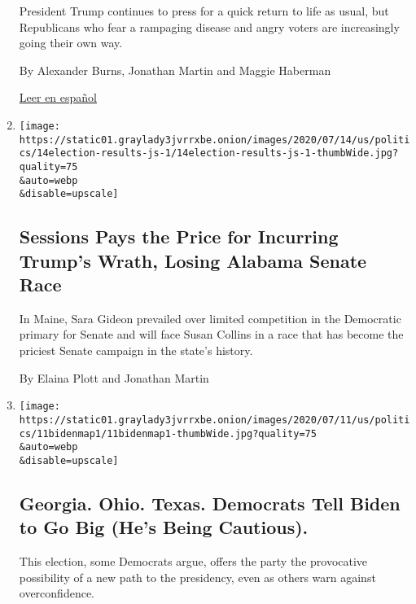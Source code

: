 \begin{enumerate}
  President Trump continues to press for a quick return to life as
  usual, but Republicans who fear a rampaging disease and angry voters
  are increasingly going their own way.

  By Alexander Burns, Jonathan Martin and Maggie Haberman

  \href{https://www.nytimes3xbfgragh.onion/es/2020/07/21/espanol/estados-unidos/donald-trump-coronavirus-republicanos.html}{Leer
  en español}
\item
  \href{/2020/07/14/us/politics/Election-primary-runoff-results.html}{}

  \texttt{[image: https://static01.graylady3jvrrxbe.onion/images/2020/07/14/us/politics/14election-results-js-1/14election-results-js-1-thumbWide.jpg?quality=75\\\&auto=webp\\\&disable=upscale]}

  \hypertarget{sessions-pays-the-price-for-incurring-trumps-wrath-losing-alabama-senate-race}{%
  \subsection{Sessions Pays the Price for Incurring Trump's Wrath,
  Losing Alabama Senate
  Race}\label{sessions-pays-the-price-for-incurring-trumps-wrath-losing-alabama-senate-race}}

  In Maine, Sara Gideon prevailed over limited competition in the
  Democratic primary for Senate and will face Susan Collins in a race
  that has become the priciest Senate campaign in the state's history.

  By Elaina Plott and Jonathan Martin
\item
  \href{/2020/07/11/us/politics/trump-biden-2020-election.html}{}

  \texttt{[image: https://static01.graylady3jvrrxbe.onion/images/2020/07/11/us/politics/11bidenmap1/11bidenmap1-thumbWide.jpg?quality=75\\\&auto=webp\\\&disable=upscale]}

  \hypertarget{georgia-ohio-texas-democrats-tell-biden-to-go-big-hes-being-cautious}{%
  \subsection{Georgia. Ohio. Texas. Democrats Tell Biden to Go Big (He's
  Being
  Cautious).}\label{georgia-ohio-texas-democrats-tell-biden-to-go-big-hes-being-cautious}}

  This election, some Democrats argue, offers the party the provocative
  possibility of a new path to the presidency, even as others warn
  against overconfidence.


\end{enumerate}
